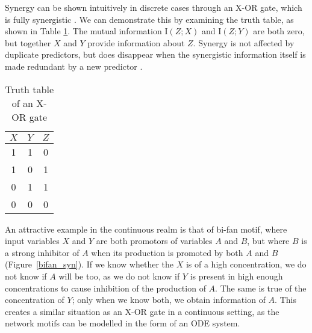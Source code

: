 \documentclass[../main.tex]{subfiles}
\begin{document}
Synergy can be shown intuitively in discrete cases through an X-OR gate, which is fully synergistic \cite{quax2017quantifying}.
We can demonstrate this by examining the truth table, as shown in Table \ref{XOR}.
The mutual information $\mathrm{I}\left( Z;X \right)$ and $\mathrm{I} \left( Z;Y \right)$ are both zero, but together $X$ and $Y$ provide information about $Z$.
Synergy is not affected by duplicate predictors, but does disappear when the synergistic information itself is made redundant by a new predictor \cite{griffith2014quantifying}.

\begin{table}[ht]
\begin{center}
\begin{tabular}{|c|c||c|}
\hline
$X$ & $Y$ & $Z$ \\
\hline
\hline
1 & 1 & 0 \\
1 & 0 & 1 \\
0 & 1 & 1 \\
0 & 0 & 0 \\
\hline
\end{tabular}
\end{center}
\caption{Truth table of an X-OR gate}
\label{XOR}
\end{table}

An attractive example in the continuous realm is that of bi-fan motif, where input variables $X$ and $Y$ are both promotors of variables $A$ and $B$, but where $B$ is a strong inhibitor of $A$ when its production is promoted by both $A$ and $B$ (Figure~\ref{bifan_syn}).
If we know whether the $X$ is of a high concentration, we do not know if $A$ will be too, as we do not know if $Y$ is present in high enough concentrations to cause inhibition of the production of $A$.
The same is true of the concentration of $Y$; only when we know both, we obtain information of $A$.
This creates a similar situation as an X-OR gate in a continuous setting, as the network motifs can be modelled in the form of an ODE system.
\end{document}
